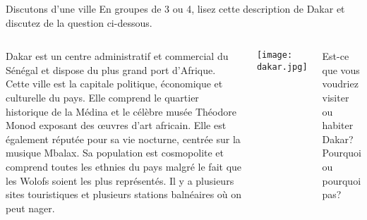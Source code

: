 \begin{frame}{Discutons d'une ville}
  En groupes de 3 ou 4, lisez cette description de Dakar et discutez de la question ci-dessous.
  \vspace{0.25cm}
  \begin{columns}
    \small
      Dakar est un centre administratif et commercial du Sénégal et dispose du plus grand port d'Afrique.
      Cette ville est la capitale politique, économique et culturelle du pays.
      Elle comprend le quartier historique de la Médina et le célèbre musée Théodore Monod exposant des œuvres d'art africain.
      Elle est également réputée pour sa vie nocturne, centrée sur la musique Mbalax.
      Sa population est cosmopolite et comprend toutes les ethnies du pays malgré le fait que les Wolofs soient les plus représentés.
      Il y a plusieurs sites touristiques et plusieurs stations balnéaires où on peut nager.
      \begin{center}
        \texttt{[image: dakar.jpg]}
      \end{center}
      Est-ce que vous voudriez visiter ou habiter Dakar?
      Pourquoi ou pourquoi pas?
  \end{columns}
\end{frame}
